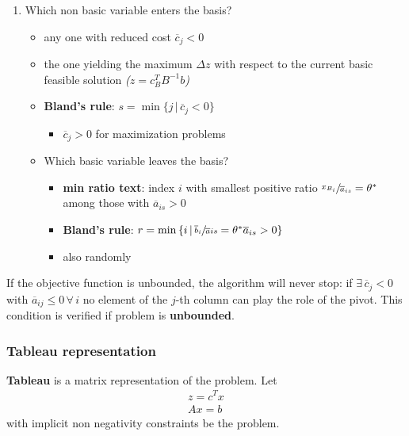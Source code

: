 \documentclass[english]{article}
\begin{document}
\begin{enumerate}
  \item Which non basic variable enters the basis?
        \begin{itemize}
          \item any one with reduced cost \(\overline{c}_j < 0\)
          \item the one yielding the maximum \(\Delta z\) with respect to the current basic feasible solution \textit{(\(z = c_B^T B^{-1} b\))}
          \item \textbf{Bland's rule}: \(s = \min \{ j \, | \, \overline{c}_j < 0 \}\)
                \begin{itemize}[label=\(\rightarrow\)]
                  \item \(\overline{c}_j > 0\) for maximization problems
                \end{itemize}
          \item Which basic variable leaves the basis?
                \begin{itemize}
                  \item \textbf{min ratio text}: index \(i\) with smallest positive ratio \(\sfrac{x_{B_i}}{\overline{a}_{is}} = \theta^\ast\) among those with \(\overline{a}_{is} > 0\)
                  \item \textbf{Bland's rule}: \(r = \min \left\{ i \, | \, \sfrac{\overline{b}_i}{\overline{a}{is}} = \theta^\ast \overline{a}_{is} > 0 \right\}\)
                  \item also randomly
                \end{itemize}
        \end{itemize}
\end{enumerate}

\bigskip
\begin{property}[Unboundedness]
  If the objective function is unbounded, the algorithm will never stop: if \(\exists \, \overline{c}_j < 0\) with \(\overline{a}_{ij} \leq 0 \, \forall \, i\) no element of the \(j\)-th column can play the role of the pivot.
  This condition is verified if problem is \textbf{unbounded}.
\end{property}

\subsubsection{Tableau representation}

\textbf{Tableau} is a matrix representation of the \LP problem.
Let
\[ \begin{matrix} z = c^T x \\ Ax = b \end{matrix}\] with implicit non negativity constraints be the \LP problem.
\end{document}
